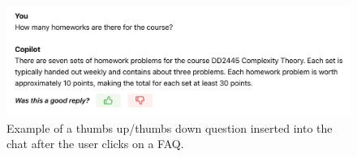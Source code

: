 \begin{figure}[H]
    \centering
    \includegraphics[width=\textwidth]{content/figures/assets/14-feedback-thumbs.png}
    \caption{Example of a thumbs up/thumbs down question inserted into the chat after the user clicks on a FAQ.}
    \label{fig:feedback_thumbs}
\end{figure}
